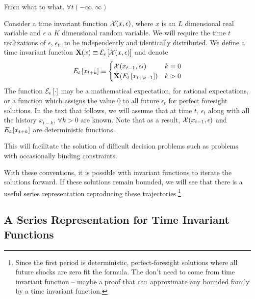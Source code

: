 \documentclass[12pt]{article}
\begin{document}
From what to what.  $\forall t (-\infty,\infty)$ 

Consider a time invariant function $\mathcal{X}(x,\epsilon)$, where $x$ is an $L$ dimensional real variable and $\epsilon$ a $K$ dimensional random variable. 
We will require
the time $t$ realizations of $\epsilon$, $\epsilon_t$, to be independently and identically distributed.
We define a time invariant function $\mathbf{X}(x)\equiv \mathcal{E}_{\epsilon} \left [\mathcal{X}(x,\epsilon) \right ]$ and denote
\begin{gather*}
E_{t} \left [x_{t+k} \right ]\equiv\begin{cases}
\mathcal{X}{(x_{t-1},\epsilon_t)} &k=0\\
\mathbf{X}{(E_{t} \left [x_{t+k-1} \right ])} &k>0
\end{cases}
\end{gather*}
The function $\mathcal{E}_{\epsilon} \left [\cdot \right ]$ may be a mathematical expectation, for rational expectations, or a function which assigns the value $0$ to all future $\epsilon_t$ for perfect foresight solutions.
In the text that follows, we will assume that at time $t$, $\epsilon_t$ along with all the history $x_{t-k},\, \forall k>0$ are known.
Note that as a result, 
$\mathcal{X}{(x_{t-1},\epsilon)}$ and 
$E_{t} \left [x_{t+k} \right ]$ are deterministic functions.  

This will facilitate the solution of difficult decision problems such as problems with
occasionally binding constraints. 


With these conventions,  it is possible with invariant functions to iterate the solutions forward.
If these solutions remain bounded, we will see that there is a useful series representation
 reproducing these trajectories.\footnote{
  Since the first
period is deterministic,  perfect-foresight solutions 
where all future shocks are zero fit the formula. The don't need to come from time invariant function -- maybe a proof that can approximate any bounded family by a time invariant function.
}



  \subsection{A  Series Representation for Time Invariant Functions}
\end{document}
